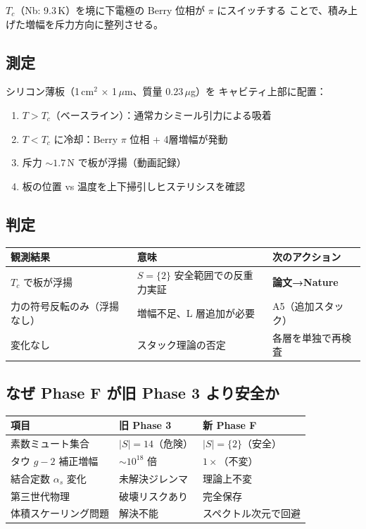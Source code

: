 \documentclass[11pt,a4paper]{article}
\begin{document}
$T_c$（Nb: 9.3\,K）を境に下電極の Berry 位相が $\pi$ にスイッチする
ことで、積み上げた増幅を斥力方向に整列させる。

\subsection{測定}

シリコン薄板（1\,cm$^2$ × 1\,$\mu$m、質量 0.23\,$\mu$g）を
キャビティ上部に配置：
\begin{enumerate}
\item $T > T_c$（ベースライン）：通常カシミール引力による吸着
\item $T < T_c$ に冷却：Berry $\pi$ 位相 + 4層増幅が発動
\item 斥力 $\sim 1.7$\,N で板が浮揚（動画記録）
\item 板の位置 vs 温度を上下掃引しヒステリシスを確認
\end{enumerate}

\subsection{判定}

\begin{center}
\begin{tabular}{lll}
\toprule
観測結果 & 意味 & 次のアクション \\
\midrule
$T_c$ で板が浮揚 & $S=\{2\}$ 安全範囲での反重力実証 & \textbf{論文→Nature} \\
力の符号反転のみ（浮揚なし） & 増幅不足、L 層追加が必要 & A5（追加スタック） \\
変化なし & スタック理論の否定 & 各層を単独で再検査 \\
\bottomrule
\end{tabular}
\end{center}

\subsection{なぜ Phase F が旧 Phase 3 より安全か}

\begin{tcolorbox}[colback=green!5,colframe=green!60!black,title=安全性の比較]
\begin{tabular}{lll}
\toprule
項目 & 旧 Phase 3 & 新 Phase F \\
\midrule
素数ミュート集合 & $|S|=14$（危険） & $|S|=\{2\}$（安全） \\
タウ $g-2$ 補正増幅 & $\sim 10^{18}$ 倍 & $1\times$（不変） \\
結合定数 $\alpha_s$ 変化 & 未解決ジレンマ & 理論上不変 \\
第三世代物理 & 破壊リスクあり & 完全保存 \\
体積スケーリング問題 & 解決不能 & スペクトル次元で回避 \\
\bottomrule
\end{tabular}
\end{tcolorbox}
\end{document}
